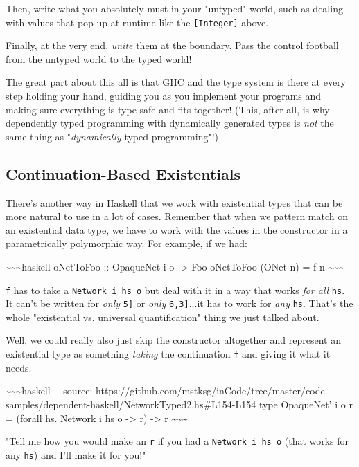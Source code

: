 \documentclass[]{article}
\begin{document}
Then, write what you absolutely must in your "untyped" world, such as dealing
with values that pop up at runtime like the \texttt{{[}Integer{]}} above.

Finally, at the very end, \emph{unite} them at the boundary. Pass the control
football from the untyped world to the typed world!

The great part about this all is that GHC and the type system is there at every
step holding your hand, guiding you as you implement your programs and making
sure everything is type-safe and fits together! (This, after all, is why
dependently typed programming with dynamically generated types is \emph{not} the
same thing as "\emph{dynamically} typed programming"!)

\subsection{Continuation-Based Existentials}

There's another way in Haskell that we work with existential types that can be
more natural to use in a lot of cases. Remember that when we pattern match on an
existential data type, we have to work with the values in the constructor in a
parametrically polymorphic way. For example, if we had:

\textasciitilde{}\textasciitilde{}\textasciitilde{}haskell oNetToFoo ::
OpaqueNet i o -\textgreater{} Foo oNetToFoo (ONet n) = f n
\textasciitilde{}\textasciitilde{}\textasciitilde{}

\texttt{f} has to take a \texttt{Network\ i\ hs\ o} but deal with it in a way
that works \emph{for all} \texttt{hs}. It can't be written for \emph{only}
\texttt{\textquotesingle{}{[}5{]}} or \emph{only}
\texttt{\textquotesingle{}{[}6,3{]}}...it has to work for \emph{any}
\texttt{hs}. That's the whole "existential vs. universal quantification" thing
we just talked about.

Well, we could really also just skip the constructor altogether and represent an
existential type as something \emph{taking} the continuation \texttt{f} and
giving it what it needs.

\textasciitilde{}\textasciitilde{}\textasciitilde{}haskell -\/- source:
https://github.com/mstksg/inCode/tree/master/code-samples/dependent-haskell/NetworkTyped2.hs\#L154-L154
type OpaqueNet' i o r = (forall hs. Network i hs o -\textgreater{} r)
-\textgreater{} r \textasciitilde{}\textasciitilde{}\textasciitilde{}

"Tell me how you would make an \texttt{r} if you had a
\texttt{Network\ i\ hs\ o} (that works for any \texttt{hs}) and I'll make it for
you!"
\end{document}
